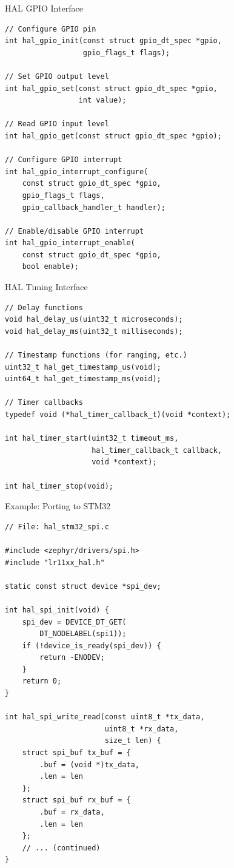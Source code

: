 \documentclass{beamer}
\begin{document}
\begin{frame}[fragile]{HAL GPIO Interface}
\begin{lstlisting}[caption={GPIO HAL Functions}]
// Configure GPIO pin
int hal_gpio_init(const struct gpio_dt_spec *gpio,
                  gpio_flags_t flags);

// Set GPIO output level
int hal_gpio_set(const struct gpio_dt_spec *gpio,
                 int value);

// Read GPIO input level
int hal_gpio_get(const struct gpio_dt_spec *gpio);

// Configure GPIO interrupt
int hal_gpio_interrupt_configure(
    const struct gpio_dt_spec *gpio,
    gpio_flags_t flags,
    gpio_callback_handler_t handler);

// Enable/disable GPIO interrupt
int hal_gpio_interrupt_enable(
    const struct gpio_dt_spec *gpio,
    bool enable);
\end{lstlisting}
\end{frame}

\begin{frame}[fragile]{HAL Timing Interface}
\begin{lstlisting}[caption={Timing HAL Functions}]
// Delay functions
void hal_delay_us(uint32_t microseconds);
void hal_delay_ms(uint32_t milliseconds);

// Timestamp functions (for ranging, etc.)
uint32_t hal_get_timestamp_us(void);
uint64_t hal_get_timestamp_ms(void);

// Timer callbacks
typedef void (*hal_timer_callback_t)(void *context);

int hal_timer_start(uint32_t timeout_ms,
                    hal_timer_callback_t callback,
                    void *context);

int hal_timer_stop(void);
\end{lstlisting}
\end{frame}

\begin{frame}[fragile]{Example: Porting to STM32}
\begin{lstlisting}[caption={STM32 HAL SPI Implementation}]
// File: hal_stm32_spi.c

#include <zephyr/drivers/spi.h>
#include "lr11xx_hal.h"

static const struct device *spi_dev;

int hal_spi_init(void) {
    spi_dev = DEVICE_DT_GET(
        DT_NODELABEL(spi1));
    if (!device_is_ready(spi_dev)) {
        return -ENODEV;
    }
    return 0;
}

int hal_spi_write_read(const uint8_t *tx_data,
                       uint8_t *rx_data,
                       size_t len) {
    struct spi_buf tx_buf = {
        .buf = (void *)tx_data,
        .len = len
    };
    struct spi_buf rx_buf = {
        .buf = rx_data,
        .len = len
    };
    // ... (continued)
}
\end{lstlisting}
\end{frame}
\end{document}
